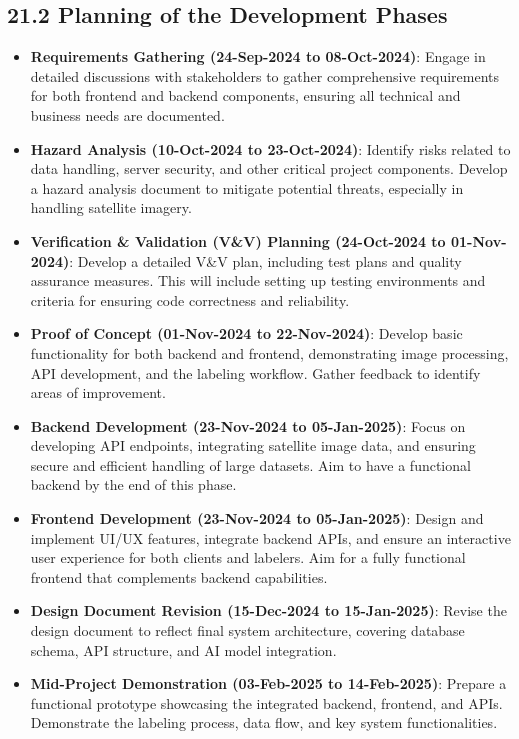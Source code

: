 \documentclass[12pt]{article}
\begin{document}
\subsection*{21.2 Planning of the Development Phases}
\begin{itemize} 
    \item \textbf{Requirements Gathering (24-Sep-2024 to 08-Oct-2024)}: Engage in detailed discussions with stakeholders to gather comprehensive requirements for both frontend and backend components, ensuring all technical and business needs are documented.
    \item \textbf{Hazard Analysis (10-Oct-2024 to 23-Oct-2024)}: Identify risks related to data handling, server security, and other critical project components. Develop a hazard analysis document to mitigate potential threats, especially in handling satellite imagery.
    \item \textbf{Verification \& Validation (V\&V) Planning (24-Oct-2024 to 01-Nov-2024)}: Develop a detailed V\&V plan, including test plans and quality assurance measures. This will include setting up testing environments and criteria for ensuring code correctness and reliability.
    \item \textbf{Proof of Concept (01-Nov-2024 to 22-Nov-2024)}: Develop basic functionality for both backend and frontend, demonstrating image processing, API development, and the labeling workflow. Gather feedback to identify areas of improvement.
    \item \textbf{Backend Development (23-Nov-2024 to 05-Jan-2025)}: Focus on developing API endpoints, integrating satellite image data, and ensuring secure and efficient handling of large datasets. Aim to have a functional backend by the end of this phase.
    \item \textbf{Frontend Development (23-Nov-2024 to 05-Jan-2025)}: Design and implement UI/UX features, integrate backend APIs, and ensure an interactive user experience for both clients and labelers. Aim for a fully functional frontend that complements backend capabilities.
    \item \textbf{Design Document Revision (15-Dec-2024 to 15-Jan-2025)}: Revise the design document to reflect final system architecture, covering database schema, API structure, and AI model integration.
    \item \textbf{Mid-Project Demonstration (03-Feb-2025 to 14-Feb-2025)}: Prepare a functional prototype showcasing the integrated backend, frontend, and APIs. Demonstrate the labeling process, data flow, and key system functionalities.

\end{itemize}
\end{document}
